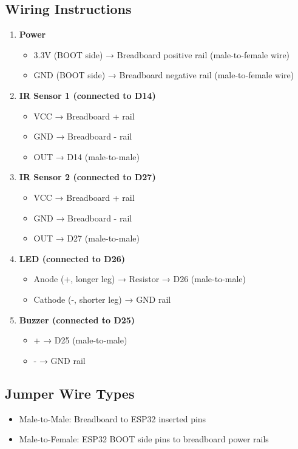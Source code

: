 \documentclass[12pt,a4paper]{article}
\begin{document}
\subsection*{Wiring Instructions}

\begin{enumerate}
  \item \textbf{Power}
  \begin{itemize}
    \item 3.3V (BOOT side) → Breadboard positive rail (male-to-female wire)
    \item GND (BOOT side) → Breadboard negative rail (male-to-female wire)
  \end{itemize}

  \item \textbf{IR Sensor 1 (connected to D14)}
  \begin{itemize}
    \item VCC → Breadboard + rail
    \item GND → Breadboard - rail
    \item OUT → D14 (male-to-male)
  \end{itemize}

  \item \textbf{IR Sensor 2 (connected to D27)}
  \begin{itemize}
    \item VCC → Breadboard + rail
    \item GND → Breadboard - rail
    \item OUT → D27 (male-to-male)
  \end{itemize}

  \item \textbf{LED (connected to D26)}
  \begin{itemize}
    \item Anode (+, longer leg) → Resistor → D26 (male-to-male)
    \item Cathode (-, shorter leg) → GND rail
  \end{itemize}

  \item \textbf{Buzzer (connected to D25)}
  \begin{itemize}
    \item + → D25 (male-to-male)
    \item - → GND rail
  \end{itemize}
\end{enumerate}

\subsection*{Jumper Wire Types}
\begin{itemize}
  \item Male-to-Male: Breadboard to ESP32 inserted pins
  \item Male-to-Female: ESP32 BOOT side pins to breadboard power rails
\end{itemize}
\end{document}
